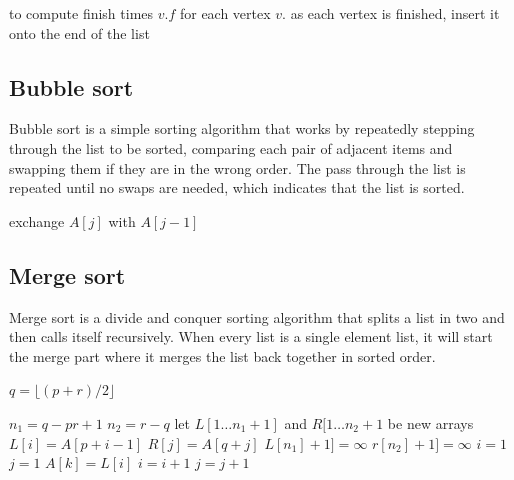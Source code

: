 \documentclass[a4paper, 10pt]{article}
\begin{document}
\begin{algorithmic}
\begin{algorithmic}
\State {} to compute finish times $v.f$ for each vertex $v$.
\State as each vertex is finished, insert it onto the end of the list
\State {}
\EndFunction
\end{algorithmic}

\subsection{Bubble sort}
Bubble sort is a simple sorting algorithm that works by repeatedly stepping through the list to be sorted, comparing each pair of adjacent items and swapping them if they are in the wrong order. The pass through the list is repeated until no swaps are needed, which indicates that the list is sorted. 
\begin{algorithmic}
                        \State exchange $A[j]$ with $A[j-1]$
                \EndIf
        \EndFor
\EndFor
\end{algorithmic}
\subsection{Merge sort}
Merge sort is a divide and conquer sorting algorithm that splits a list in two and then calls itself recursively. When every list is a single element list, it will start the merge part where it merges the list back together in sorted order.
\\

\begin{algorithmic}
                \State $q = \lfloor(p + r) / 2 \rfloor $ 
                \State {} 
                \State {}
                \State {} 
         \EndIf
\EndFunction
\State 

\State ${n_{1}}=q-pr+1$
\State ${n_{2}}=r-q$
\State let $L[1 \dots {n_{1}} + 1]$ and $R[1 \dots {n_{2}+1}$ be new arrays
        \State $L[i] = A[p + i -1]$
\EndFor
{}
        \State $R[j] = A[q + j]$
\EndFor
\State $L[{n_{1}}] + 1] = \infty$
\State $r[{n_{2}}] + 1] = \infty$
\State $i = 1$
\State $j = 1$
                \State $A[k] = L[i]$
                \State $i = i + 1$
        \Else 
                        \State $j = j + 1$
                \EndIf        
        \EndIf
\EndFor
\EndFunction
\end{algorithmic}



\end{algorithmic}
\end{document}
